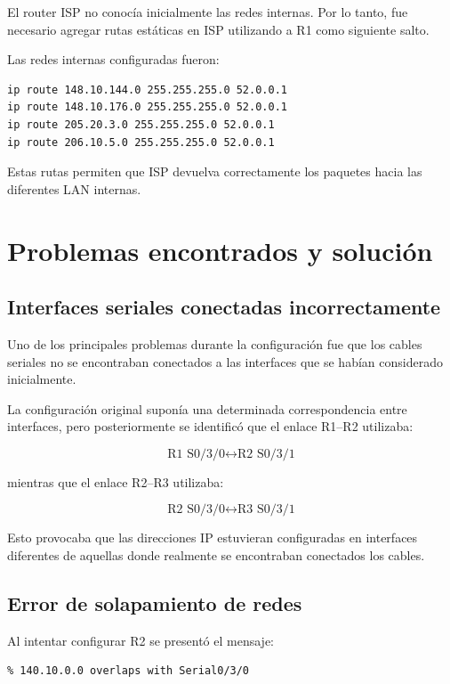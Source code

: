 \documentclass[12pt,a4paper]{article}
\begin{document}
El router ISP no conocía inicialmente las redes internas. Por lo tanto, fue necesario agregar rutas estáticas en ISP utilizando a R1 como siguiente salto.

Las redes internas configuradas fueron:

\begin{lstlisting}[style=cisco]
ip route 148.10.144.0 255.255.255.0 52.0.0.1
ip route 148.10.176.0 255.255.255.0 52.0.0.1
ip route 205.20.3.0 255.255.255.0 52.0.0.1
ip route 206.10.5.0 255.255.255.0 52.0.0.1
\end{lstlisting}

Estas rutas permiten que ISP devuelva correctamente los paquetes hacia las diferentes LAN internas.

\section{Problemas encontrados y solución}

\subsection{Interfaces seriales conectadas incorrectamente}

Uno de los principales problemas durante la configuración fue que los cables seriales no se encontraban conectados a las interfaces que se habían considerado inicialmente.

La configuración original suponía una determinada correspondencia entre interfaces, pero posteriormente se identificó que el enlace R1--R2 utilizaba:

$$
\text{R1 S0/3/0} \leftrightarrow \text{R2 S0/3/1}
$$

mientras que el enlace R2--R3 utilizaba:

$$
\text{R2 S0/3/0} \leftrightarrow \text{R3 S0/3/1}
$$

Esto provocaba que las direcciones IP estuvieran configuradas en interfaces diferentes de aquellas donde realmente se encontraban conectados los cables.

\subsection{Error de solapamiento de redes}

Al intentar configurar R2 se presentó el mensaje:

\begin{verbatim}
% 140.10.0.0 overlaps with Serial0/3/0
\end{verbatim}
\end{document}
